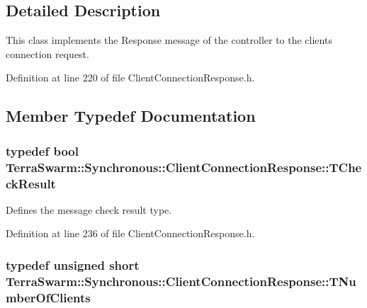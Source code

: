 \subsection{Detailed Description}
This class implements the Response message of the controller to the clients connection request. 

Definition at line 220 of file Client\-Connection\-Response.\-h.



\subsection{Member Typedef Documentation}
\hypertarget{class_terra_swarm_1_1_synchronous_1_1_client_connection_response_a33254e9e1216ca2dde89b8a66f7ad18e}{
\subsubsection[{T\-Check\-Result}]{\setlength{\rightskip}{0pt plus 5cm}typedef bool {\bf Terra\-Swarm\-::\-Synchronous\-::\-Client\-Connection\-Response\-::\-T\-Check\-Result}}}\label{class_terra_swarm_1_1_synchronous_1_1_client_connection_response_a33254e9e1216ca2dde89b8a66f7ad18e}


Defines the message check result type. 



Definition at line 236 of file Client\-Connection\-Response.\-h.

\hypertarget{class_terra_swarm_1_1_synchronous_1_1_client_connection_response_adc391c9557f0acfdb0763043058cdf83}{
\subsubsection[{T\-Number\-Of\-Clients}]{\setlength{\rightskip}{0pt plus 5cm}typedef unsigned short {\bf Terra\-Swarm\-::\-Synchronous\-::\-Client\-Connection\-Response\-::\-T\-Number\-Of\-Clients}}}\label{class_terra_swarm_1_1_synchronous_1_1_client_connection_response_adc391c9557f0acfdb0763043058cdf83}


